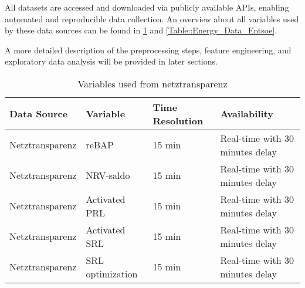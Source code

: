 \documentclass[class=scrbook, crop=false]{standalone}
\begin{document}
All datasets are accessed and downloaded via publicly available APIs, enabling automated and reproducible data collection.
An overview about all variables used by these data sources can be found in \ref{Table::Energy_Data_Netztransparenz} and \ref{Table::Energy_Data_Entsoe}.

A more detailed description of the preprocessing steps, feature engineering, and exploratory data analysis will be provided in later sections.

\begin{table}[]
\begin{tabular}{l|l|l|l}
 Data Source & Variable &  Time Resolution & Availability  \\\hline
 Netztransparenz & reBAP & 15 min & Real-time with 30 minutes delay \\
 Netztransparenz & NRV-saldo & 15 min & Real-time with 30 minutes delay \\
 Netztransparenz & Activated PRL & 15 min & Real-time with 30 minutes delay \\
 Netztransparenz & Activated SRL & 15 min & Real-time with 30 minutes delay \\
 Netztransparenz & SRL optimization & 15 min & Real-time with 30 minutes delay \\
 
\end{tabular}
\caption{Variables used from netztransparenz}
\label{Table::Energy_Data_Netztransparenz}
\end{table}
\end{document}
